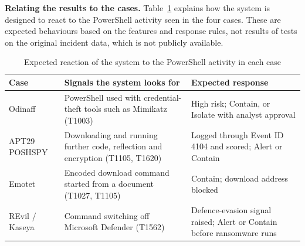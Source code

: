 \documentclass[12pt,a4paper]{article}
\newcommand{\head}[1]{\noindent\textbf{#1}\quad}
\begin{document}
\head{Relating the results to the cases.} Table~\ref{tab:mapping} explains how the system is designed to react to the PowerShell activity seen in the four cases. These are expected behaviours based on the features and response rules, not results of tests on the original incident data, which is not publicly available.

\begin{table}[htbp]
\centering
\caption{Expected reaction of the system to the PowerShell activity in each case}\label{tab:mapping}
\begin{tabularx}{\textwidth}{>{\raggedright\arraybackslash}p{2.9cm} >{\raggedright\arraybackslash}X >{\raggedright\arraybackslash}X}
\toprule
\textbf{Case} & \textbf{Signals the system looks for} & \textbf{Expected response}\\
\midrule
Odinaff & PowerShell used with credential-theft tools such as Mimikatz (T1003) & High risk; Contain, or Isolate with analyst approval\\
APT29 POSHSPY & Downloading and running further code, reflection and encryption (T1105, T1620) & Logged through Event ID 4104 and scored; Alert or Contain\\
Emotet & Encoded download command started from a document (T1027, T1105) & Contain; download address blocked\\
REvil / Kaseya & Command switching off Microsoft Defender (T1562) & Defence-evasion signal raised; Alert or Contain before ransomware runs\\
\bottomrule
\end{tabularx}
\end{table}
\end{document}
